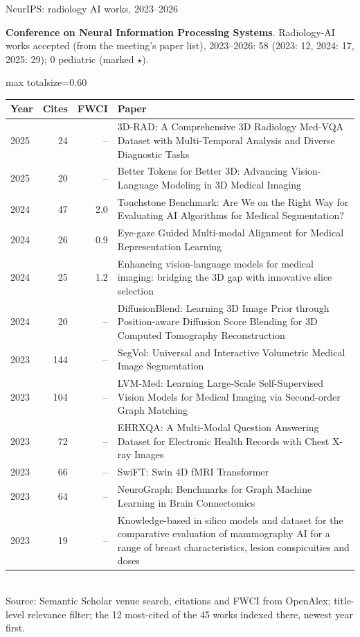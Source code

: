 \documentclass[aspectratio=169]{beamer}
\renewcommand{\arraystretch}{1.08}
\begin{document}
\begin{frame}[category=Conferences]{NeurIPS: radiology AI works, 2023--2026}
{\scriptsize \textbf{Conference on Neural Information Processing Systems}. Radiology-AI works accepted (from the meeting's paper list), 2023--2026: 58 (2023: 12, 2024: 17, 2025: 29); 0 pediatric (marked $\star$).\par}\vspace{2pt}
\tiny
\begin{adjustbox}{max totalsize={\textwidth}{0.60\textheight}}
\renewcommand{\arraystretch}{1.2}
\begin{tabular}{|l|r|r|>{\raggedright\arraybackslash}p{}|}
\hline \textbf{Year} & \textbf{Cites} & \textbf{FWCI} & \textbf{Paper} \\ \hline
2025 & 24 & -- & 3D-RAD: A Comprehensive 3D Radiology Med-VQA Dataset with Multi-Temporal Analysis and Diverse Diagnostic Tasks \\ \hline
2025 & 20 & -- & Better Tokens for Better 3D: Advancing Vision-Language Modeling in 3D Medical Imaging \\ \hline
2024 & 47 & 2.0 & Touchstone Benchmark: Are We on the Right Way for Evaluating AI Algorithms for Medical Segmentation? \\ \hline
2024 & 26 & 0.9 & Eye-gaze Guided Multi-modal Alignment for Medical Representation Learning \\ \hline
2024 & 25 & 1.2 & Enhancing vision-language models for medical imaging: bridging the 3D gap with innovative slice selection \\ \hline
2024 & 20 & -- & DiffusionBlend: Learning 3D Image Prior through Position-aware Diffusion Score Blending for 3D Computed Tomography Reconstruction \\ \hline
2023 & 144 & -- & SegVol: Universal and Interactive Volumetric Medical Image Segmentation \\ \hline
2023 & 104 & -- & LVM-Med: Learning Large-Scale Self-Supervised Vision Models for Medical Imaging via Second-order Graph Matching \\ \hline
2023 & 72 & -- & EHRXQA: A Multi-Modal Question Answering Dataset for Electronic Health Records with Chest X-ray Images \\ \hline
2023 & 66 & -- & SwiFT: Swin 4D fMRI Transformer \\ \hline
2023 & 64 & -- & NeuroGraph: Benchmarks for Graph Machine Learning in Brain Connectomics \\ \hline
2023 & 19 & -- & Knowledge-based in silico models and dataset for the comparative evaluation of mammography AI for a range of breast characteristics, lesion conspicuities and doses \\ \hline
\end{tabular}
\end{adjustbox}
\\[2pt]
{\tiny Source: Semantic Scholar venue search, citations and FWCI from OpenAlex; title-level relevance filter; the 12 most-cited of the 45 works indexed there, newest year first.}
\end{frame}
\end{document}
